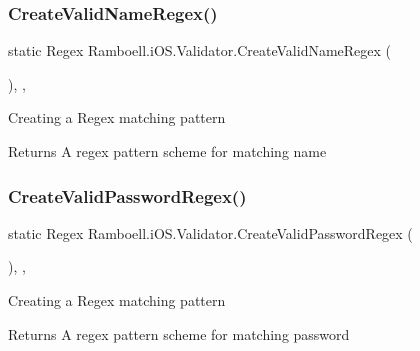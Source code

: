 \subsubsection{\texorpdfstring{Create\+Valid\+Name\+Regex()}{CreateValidNameRegex()}}
{\footnotesize\ttfamily static Regex Ramboell.\+i\+O\+S.\+Validator.\+Create\+Valid\+Name\+Regex (\begin{DoxyParamCaption}{ }\end{DoxyParamCaption})\hspace{0.3cm}{\ttfamily [inline]}, {\ttfamily [static]}, {\ttfamily [private]}}



Creating a Regex matching pattern 

\begin{DoxyReturn}{Returns}
A regex pattern scheme for matching name
\end{DoxyReturn}
\mbox{\label{class_ramboell_1_1i_o_s_1_1_validator_abec24ab9e7a001acd05cc37a9ffdb26b}} 
\subsubsection{\texorpdfstring{Create\+Valid\+Password\+Regex()}{CreateValidPasswordRegex()}}
{\footnotesize\ttfamily static Regex Ramboell.\+i\+O\+S.\+Validator.\+Create\+Valid\+Password\+Regex (\begin{DoxyParamCaption}{ }\end{DoxyParamCaption})\hspace{0.3cm}{\ttfamily [inline]}, {\ttfamily [static]}, {\ttfamily [private]}}



Creating a Regex matching pattern 

\begin{DoxyReturn}{Returns}
A regex pattern scheme for matching password
\end{DoxyReturn}
\mbox{\label{class_ramboell_1_1i_o_s_1_1_validator_a4ddde85cd5af147feb9f2a308ea86f47}} 
